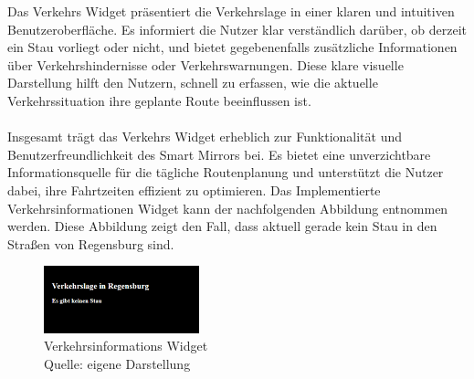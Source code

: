 \noindent
Das Verkehrs Widget präsentiert die Verkehrslage in einer klaren und intuitiven Benutzeroberfläche. Es informiert die Nutzer klar verständlich darüber, ob derzeit ein Stau vorliegt oder nicht, und bietet gegebenenfalls zusätzliche Informationen über Verkehrshindernisse oder Verkehrswarnungen. Diese klare visuelle Darstellung hilft den Nutzern, schnell zu erfassen, wie die aktuelle Verkehrssituation ihre geplante Route beeinflussen ist. \\ \\
\noindent
Insgesamt trägt das Verkehrs Widget erheblich zur Funktionalität und Benutzerfreundlichkeit des Smart Mirrors bei. Es bietet eine unverzichtbare Informationsquelle für die tägliche Routenplanung und unterstützt die Nutzer dabei, ihre Fahrtzeiten effizient zu optimieren. Das Implementierte Verkehrsinformationen Widget kann der nachfolgenden Abbildung entnommen werden. Diese Abbildung zeigt den Fall, dass aktuell gerade kein Stau  in den Straßen von Regensburg sind.

\begin{figure}[h]
    \centering
    \includegraphics[width=0.4\textwidth]{pictures/traffic_widget.png}
  \captionsetup{justification=centering, labelformat=simple, singlelinecheck=false}
    \caption[Verkehrsinformations Widget]{Verkehrsinformations Widget\\ Quelle: eigene Darstellung}
\end{figure}

